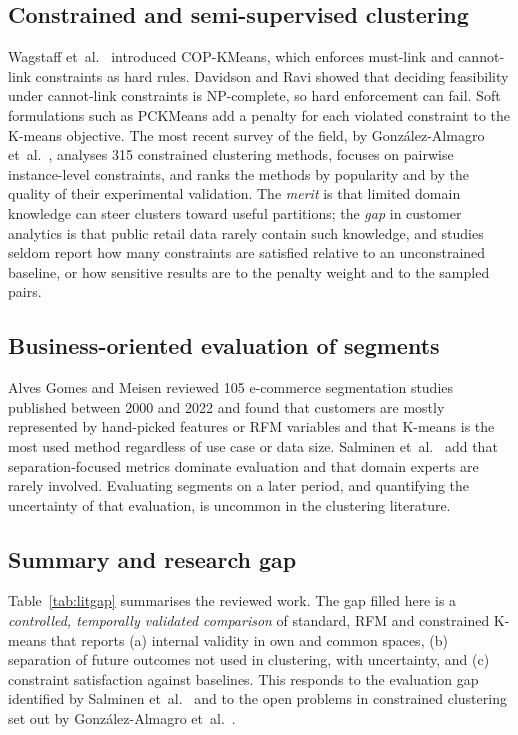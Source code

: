 \documentclass[conference,10pt]{IEEEtran}
\begin{document}
\subsection{Constrained and semi-supervised clustering}
Wagstaff et~al.\ \cite{wagstaff2001constrained} introduced COP-KMeans, which
enforces must-link and cannot-link constraints as hard rules. Davidson and
Ravi \cite{davidson2005clustering} showed that deciding feasibility under
cannot-link constraints is NP-complete, so hard enforcement can fail. Soft
formulations such as PCKMeans \cite{basu2004probabilistic} add a penalty for
each violated constraint to the K-means objective. The most recent survey of
the field, by Gonz\'alez-Almagro et~al.\ \cite{gonzalez2025semi}, analyses
315 constrained clustering methods, focuses on pairwise instance-level
constraints, and ranks the methods by popularity and by the quality of their
experimental validation. The \emph{merit} is that
limited domain knowledge can steer clusters toward useful partitions; the
\emph{gap} in customer analytics is that public retail data rarely contain
such knowledge, and studies seldom report how many constraints are satisfied
relative to an unconstrained baseline, or how sensitive results are to the
penalty weight and to the sampled pairs.

\subsection{Business-oriented evaluation of segments}
Alves Gomes and Meisen \cite{gomes2023review} reviewed 105 e-commerce
segmentation studies published between 2000 and 2022 and found that customers
are mostly represented by hand-picked features or RFM variables and that
K-means is the most used method regardless of use case or data size. Salminen
et~al.\ \cite{salminen2023algorithms} add that separation-focused metrics
dominate evaluation and that domain experts are rarely involved.
Evaluating segments on a later period, and quantifying the uncertainty of
that evaluation, is uncommon in the clustering literature.

\subsection{Summary and research gap}
Table~\ref{tab:litgap} summarises the reviewed work. The gap filled here is a
\emph{controlled, temporally validated comparison} of standard, RFM and
constrained K-means that reports (a) internal validity in own and common
spaces, (b) separation of future outcomes not used in clustering, with
uncertainty, and (c) constraint satisfaction against baselines. This responds
to the evaluation gap identified by Salminen et~al.\
\cite{salminen2023algorithms} and to the open problems in constrained
clustering set out by Gonz\'alez-Almagro et~al.\ \cite{gonzalez2025semi}.
\end{document}
